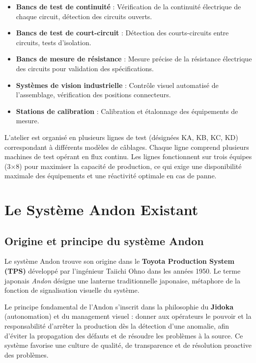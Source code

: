 \begin{itemize}
    \item \textbf{Bancs de test de continuité} : Vérification de la continuité électrique de chaque circuit, détection des circuits ouverts.
    \item \textbf{Bancs de test de court-circuit} : Détection des courts-circuits entre circuits, tests d'isolation.
    \item \textbf{Bancs de mesure de résistance} : Mesure précise de la résistance électrique des circuits pour validation des spécifications.
    \item \textbf{Systèmes de vision industrielle} : Contrôle visuel automatisé de l'assemblage, vérification des positions connecteurs.
    \item \textbf{Stations de calibration} : Calibration et étalonnage des équipements de mesure.
\end{itemize}

L'atelier est organisé en plusieurs lignes de test (désignées KA, KB, KC, KD) correspondant à différents modèles de câblages. Chaque ligne comprend plusieurs machines de test opérant en flux continu. Les lignes fonctionnent sur trois équipes (3×8) pour maximiser la capacité de production, ce qui exige une disponibilité maximale des équipements et une réactivité optimale en cas de panne.

\section{Le Système Andon Existant}

\subsection{Origine et principe du système Andon}

Le système Andon trouve son origine dans le \textbf{Toyota Production System (TPS)}\cite{andon_system} développé par l'ingénieur Taiichi Ohno dans les années 1950. Le terme japonais \textit{Andon} désigne une lanterne traditionnelle japonaise, métaphore de la fonction de signalisation visuelle du système.

Le principe fondamental de l'Andon s'inscrit dans la philosophie du \textbf{Jidoka} (autonomation) et du management visuel : donner aux opérateurs le pouvoir et la responsabilité d'arrêter la production dès la détection d'une anomalie, afin d'éviter la propagation des défauts et de résoudre les problèmes à la source. Ce système favorise une culture de qualité, de transparence et de résolution proactive des problèmes\cite{lean_manufacturing}.

